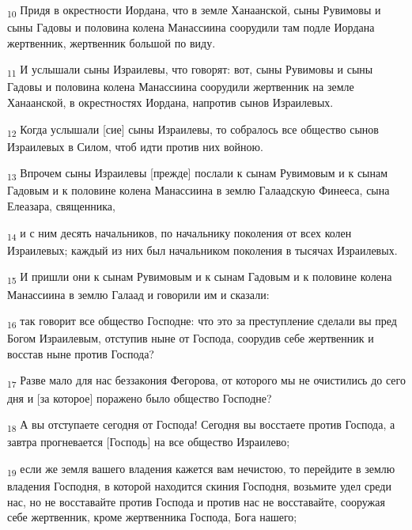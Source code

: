 \begin{tcolorbox}
\textsubscript{10} Придя в окрестности Иордана, что в земле Ханаанской, сыны Рувимовы и сыны Гадовы и половина колена Манассиина соорудили там подле Иордана жертвенник, жертвенник большой по виду.
\end{tcolorbox}
\begin{tcolorbox}
\textsubscript{11} И услышали сыны Израилевы, что говорят: вот, сыны Рувимовы и сыны Гадовы и половина колена Манассиина соорудили жертвенник на земле Ханаанской, в окрестностях Иордана, напротив сынов Израилевых.
\end{tcolorbox}
\begin{tcolorbox}
\textsubscript{12} Когда услышали [сие] сыны Израилевы, то собралось все общество сынов Израилевых в Силом, чтоб идти против них войною.
\end{tcolorbox}
\begin{tcolorbox}
\textsubscript{13} Впрочем сыны Израилевы [прежде] послали к сынам Рувимовым и к сынам Гадовым и к половине колена Манассиина в землю Галаадскую Финееса, сына Елеазара, священника,
\end{tcolorbox}
\begin{tcolorbox}
\textsubscript{14} и с ним десять начальников, по начальнику поколения от всех колен Израилевых; каждый из них был начальником поколения в тысячах Израилевых.
\end{tcolorbox}
\begin{tcolorbox}
\textsubscript{15} И пришли они к сынам Рувимовым и к сынам Гадовым и к половине колена Манассиина в землю Галаад и говорили им и сказали:
\end{tcolorbox}
\begin{tcolorbox}
\textsubscript{16} так говорит все общество Господне: что это за преступление сделали вы пред Богом Израилевым, отступив ныне от Господа, соорудив себе жертвенник и восстав ныне против Господа?
\end{tcolorbox}
\begin{tcolorbox}
\textsubscript{17} Разве мало для нас беззакония Фегорова, от которого мы не очистились до сего дня и [за которое] поражено было общество Господне?
\end{tcolorbox}
\begin{tcolorbox}
\textsubscript{18} А вы отступаете сегодня от Господа! Сегодня вы восстаете против Господа, а завтра прогневается [Господь] на все общество Израилево;
\end{tcolorbox}
\begin{tcolorbox}
\textsubscript{19} если же земля вашего владения кажется вам нечистою, то перейдите в землю владения Господня, в которой находится скиния Господня, возьмите удел среди нас, но не восставайте против Господа и против нас не восставайте, сооружая себе жертвенник, кроме жертвенника Господа, Бога нашего;
\end{tcolorbox}
